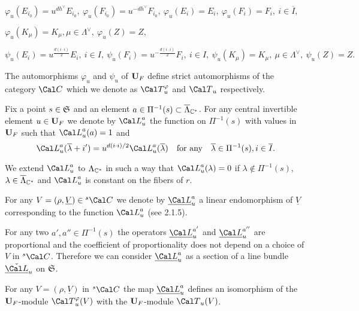 \medpagebreak

\noindent
$\varphi_u(E_{i_0}) = u^{dh^\vee}E_{i_0},\ \varphi_u(F_{i_0}) =
u^{-dh^\vee}F_{i_0},\
\varphi_u(E_i) = E_i,\ \varphi_u(F_i) = F_i,\ i \in \overline{I},$\

\noindent
$\varphi_u(K_\mu) = K_\mu,$\qquad  $\mu \in \Lambda^\vee,\ \varphi_u(Z) = Z,$

\noindent
$\psi_u(E_i) =
u^{\frac{d(i\cdot i)}{2}} E_i,\ i \in I,\ \psi_u(F_i) =
u^{-\frac{d(i\cdot i)}{2}} F_i,\ i \in I,\
\psi_u(K_\mu) = K_\mu,\ \mu \in \Lambda^\vee,\ \psi_u(Z) = Z.$

\medpagebreak

  The automorphisms $\varphi_u$  and $\psi_u$  of ${\bold U}_F$
define strict automorphisms of the category ${\Cal C}$  which we denote
as  ${\Cal T}_u^\varphi$ and  ${\Cal T}_u$ respectively.
\enddemo


  Fix a point $s \in {\frak S}$  and an element
$a \in \Pi^{-1}(s) \subset \overline{\Lambda}_{{\Bbb C}^*}$.    For any central
invertible element $u \in  {\bold U}_F$  we denote by ${\Cal L}^a_u$
the function on $\Pi^{-1}(s)$  with values in ${\bold U}_F$  such that
${\Cal L}^a_u(a) = 1$  and
$$
{\Cal L}^a_u(\overline{\lambda} + i') =
u^{d(i\cdot i)/2}{\Cal L}^a_u(\overline{\lambda})\quad
\text{for\ any}\quad \overline{\lambda} \in \Pi^{-1}(s), i \in \overline{I}.
$$

We extend  ${\Cal L}^a_u$  to  $\Lambda_{{\Bbb C}^*}$  in such a way that
${\Cal L}^a_u(\lambda) = 0$  if  $\lambda \notin \Pi^{-1}(s)$,
$\lambda \in \overline{\Lambda}_{{\Bbb C}^*}$  and ${\Cal L}^a_u$  is constant
on the fibers of $r$.

  	For any $V = (\rho, \underline{V}) \in
{}^s{\Cal C}$  we denote by  $\underline{\Cal L}^a_u$  a linear endomorphism
of  $\underline{V}$  corresponding to the function  ${\Cal L}^a_u$  (see
2.1.5).
\endproclaim

  For any two  $a',a'' \in \Pi^{-1}(s)$  the operators
$\underline{\Cal L}^{a'}_u$  and  $\underline{\Cal L}^{a''}_u$  are
proportional and the coefficient of proportionality does not depend on a
choice of  $V$  in  ${}^s{\Cal C}$.  Therefore we can consider
$\underline{\Cal L}^a_u$  as a section of a line bundle
$\check{\underline{\Cal L}}_u$  on  ${\frak S}$.
\enddemo

  For any $V = (\rho, \underline{V})$ in
${}^s{\Cal C}$  the map  ${\underline{\Cal L}}_u^a$  defines an isomorphism of
the ${\bold U}_F$-module  ${\Cal T}^\varphi_u(V)$  with the ${\bold
U}_F$-module ${\Cal T}_u(V)$.
\endproclaim

